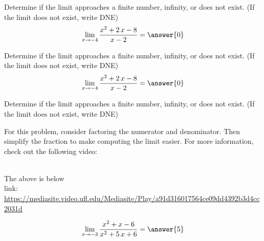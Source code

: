 \documentclass[handout]{ximera}
\begin{document}
\begin{problem}
Determine if the limit approaches a finite number, infinity, or does not exist. (If the limit does not exist, write DNE)
\[\lim_{x\to{{-4}}}\dfrac{{{x^{2} + 2 \, x - 8}}}{{{x - 2}}}=\answer{0}\]
\end{problem}%



\begin{problem}
Determine if the limit approaches a finite number, infinity, or does not exist. (If the limit does not exist, write DNE)
\[\lim_{x\to{{-4}}}\dfrac{{{x^{2} + 2 \, x - 8}}}{{{x - 2}}}=\answer{0}\]
\end{problem}%



\begin{problem}
Determine if the limit approaches a finite number, infinity, or does not exist. (If the limit does not exist, write DNE)  \vspace{5pt}
\begin{hint}
For this problem, consider factoring the numerator and denominator.  Then simplify the fraction to make computing the limit easier.  For more information, check out the following video:
\end{hint}
\begin{hint}
\\
The above is below\\
{link: \url{https://mediasite.video.ufl.edu/Mediasite/Play/a91d316017564ce09dd4392b3d4cc2031d}}
\end{hint}


\[\lim_{x\to{{-3}}}\dfrac{{{x^{2} + x - 6}}}{{{x^{2} + 5 \, x + 6}}}=\answer{{{5}}}\]
\end{problem}%
\end{document}
